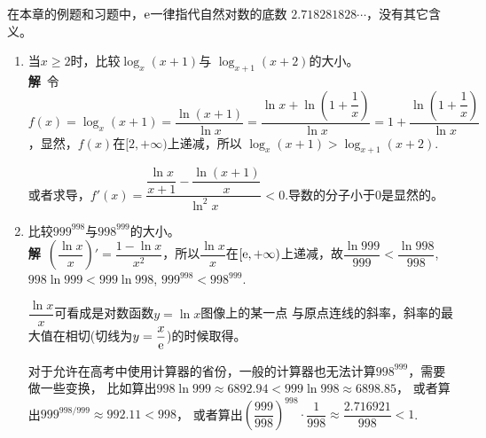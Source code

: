 \bigskip

\noindent 在本章的例题和习题中，$ \mathrm{e} $一律指代自然对数的底数
$ 2.718281828\cdots $，没有其它含义。

\begin{enumerate}[label={【\textbf{例\thechapter.\arabic*}】},
 leftmargin=\inteval{\myenumleftmargin}pt,
 itemsep=\inteval{\myenumitempsep}pt,
 itemindent=\inteval{\myenumitemindent}pt]
\item 当$ x\geq 2 $时，比较$ \log_x (x+1) $与
$ \log_{x+1} (x+2) $的大小。\\
\textbf{解}\ 令$ f(x)=\log_x (x+1)=\dfrac{\ln (x+1)}{\ln x}=\dfrac{\ln x
	+\ln\left(1+\dfrac{1}{x}	\right)}{\ln x}=1+\dfrac{\ln\left(1+\dfrac{1}{x}
	\right)}{\ln x} $，显然，$ f(x) $在$ [2,+\infty) $上递减，所以 $ \log_x (x+1)>\log_{x+1} (x+2) $. 

或者求导，$ f'(x)=\dfrac{\dfrac{\ln x}{x+1}-\dfrac{\ln(x+1)}{x}}
{\ln^2 x}  <0 $.导数的分子小于0是显然的。 

\item\label{比大小问题999_998} 比较$ 999^{998} $与$ 998^{999} $的大小。\\
\textbf{解}\ $ \left( \dfrac{\ln x}{x} \right)'=\dfrac{1-\ln x}{x^2}  $，所以$ 
\dfrac{\ln x}{x} $在$ [\mathrm{e},+\infty) $上递减，故$ \dfrac{\ln 999}{999} < \dfrac{\ln 998}{998}$, $ 998\ln999 < 999\ln 998 $, $ 999^{998} < 998^{999} $. 

$ \dfrac{\ln x}{x} $可看成是对数函数$ y=\ln x $图像上的某一点
与原点连线的斜率，斜率的最大值在相切(切线为$ y=\dfrac{x}{\mathrm{e}} $)的时候取得。

对于允许在高考中使用计算器的省份，一般的计算器也无法计算$ 998^{999} $，需要做一些变换，
比如算出$ 998\ln999 \approx 6892.94 < 999\ln 998 \approx 6898.85  $，
或者算出$ 999^{998/999}\approx 992.11 < 998 $，
或者算出$ \left(\dfrac{999}{998} \right)^{998}\cdot \dfrac{1}{998}\approx \dfrac{2.716921}{998}<1 $.


\end{enumerate}
